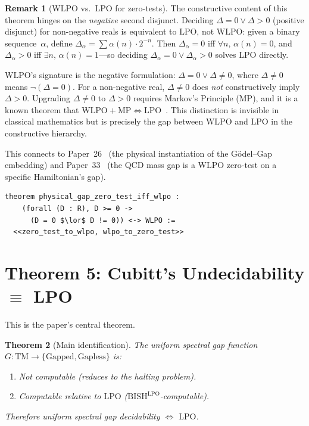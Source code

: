 \documentclass[11pt,a4paper]{article}
\theoremstyle{plain}
\newtheorem{theorem}{Theorem}[section]
\theoremstyle{definition}
\newtheorem{remark}[theorem]{Remark}
\newcommand{\LPO}{\ensuremath{\mathrm{LPO}}}
\newcommand{\WLPO}{\ensuremath{\mathrm{WLPO}}}
\newcommand{\BISH}{\ensuremath{\mathrm{BISH}}}
\newcommand{\MP}{\ensuremath{\mathrm{MP}}}
\begin{document}
\begin{remark}[WLPO vs.\ LPO for zero-tests]\label{rem:wlpo-lpo}
The constructive content of this theorem hinges on the
\emph{negative} second disjunct. Deciding
$\Delta = 0 \lor \Delta > 0$ (positive disjunct) for non-negative
reals is equivalent to $\LPO$, not $\WLPO$: given a binary
sequence~$\alpha$, define $\Delta_\alpha = \sum \alpha(n) \cdot 2^{-n}$.
Then $\Delta_\alpha = 0$ iff $\forall n,\, \alpha(n) = 0$, and
$\Delta_\alpha > 0$ iff $\exists n,\, \alpha(n) = 1$---so deciding
$\Delta_\alpha = 0 \lor \Delta_\alpha > 0$ solves $\LPO$ directly.

$\WLPO$'s signature is the negative formulation:
$\Delta = 0 \lor \Delta \neq 0$, where $\Delta \neq 0$ means
$\neg(\Delta = 0)$. For a non-negative real, $\Delta \neq 0$ does
\emph{not} constructively imply $\Delta > 0$. Upgrading
$\Delta \neq 0$ to $\Delta > 0$ requires Markov's Principle
($\MP$), and it is a known theorem that
$\WLPO + \MP \iff \LPO$~\cite{ishihara2006, bridgesvita2006}.
This distinction is invisible in classical mathematics but is
precisely the gap between $\WLPO$ and $\LPO$ in the constructive
hierarchy.
\end{remark}

This connects to Paper~26~\cite{Lee26P26} (the physical
instantiation of the G\"odel--Gap embedding) and
Paper~33~\cite{Lee26P33} (the QCD mass gap is a
$\WLPO$ zero-test on a specific Hamiltonian's gap).

\begin{lstlisting}[caption={Theorem 4: zero-test $\leftrightarrow$ WLPO (ZeroTest.lean)}]
theorem physical_gap_zero_test_iff_wlpo :
    (forall (D : R), D >= 0 ->
      (D = 0 $\lor$ D != 0)) <-> WLPO :=
  <<zero_test_to_wlpo, wlpo_to_zero_test>>
\end{lstlisting}

\section{Theorem 5: Cubitt's Undecidability $\equiv$ LPO}%
\label{sec:thm5}

This is the paper's central theorem.

\begin{theorem}[Main identification]\label{thm:cubitt}
The uniform spectral gap function
$G : \mathrm{TM} \to \{\text{Gapped}, \text{Gapless}\}$ is:
\begin{enumerate}[label=(\alph*)]
  \item Not computable (reduces to the halting problem).
  \item Computable relative to $\LPO$ ($\BISH^{\LPO}$-computable).
\end{enumerate}
Therefore uniform spectral gap decidability $\iff$ $\LPO$.
\end{theorem}
\end{document}
